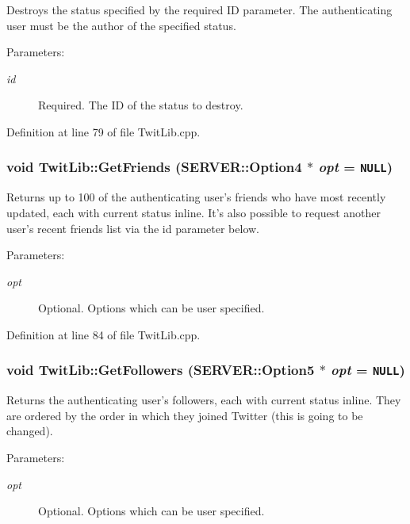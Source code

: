 Destroys the status specified by the required ID parameter. The authenticating user must be the author of the specified status. \begin{Desc}
\item[Parameters:]
\begin{description}
\item[{\em id}]Required. The ID of the status to destroy. \end{description}
\end{Desc}


Definition at line 79 of file TwitLib.cpp.\hypertarget{classTwitLib_27dd0d45500cb4cd8f32a92a255eba8d}{
\subsubsection{\setlength{\rightskip}{0pt plus 5cm}void TwitLib::GetFriends ({\bf SERVER::Option4} $\ast$ {\em opt} = {\tt NULL})}}
\label{classTwitLib_27dd0d45500cb4cd8f32a92a255eba8d}


Returns up to 100 of the authenticating user's friends who have most recently updated, each with current status inline. It's also possible to request another user's recent friends list via the id parameter below. \begin{Desc}
\item[Parameters:]
\begin{description}
\item[{\em opt}]Optional. Options which can be user specified. \end{description}
\end{Desc}


Definition at line 84 of file TwitLib.cpp.\hypertarget{classTwitLib_5a49752d1e872fe3cf8a5c055b5c2f9a}{
\subsubsection{\setlength{\rightskip}{0pt plus 5cm}void TwitLib::GetFollowers ({\bf SERVER::Option5} $\ast$ {\em opt} = {\tt NULL})}}
\label{classTwitLib_5a49752d1e872fe3cf8a5c055b5c2f9a}


Returns the authenticating user's followers, each with current status inline. They are ordered by the order in which they joined Twitter (this is going to be changed). \begin{Desc}
\item[Parameters:]
\begin{description}
\item[{\em opt}]Optional. Options which can be user specified. \end{description}
\end{Desc}


